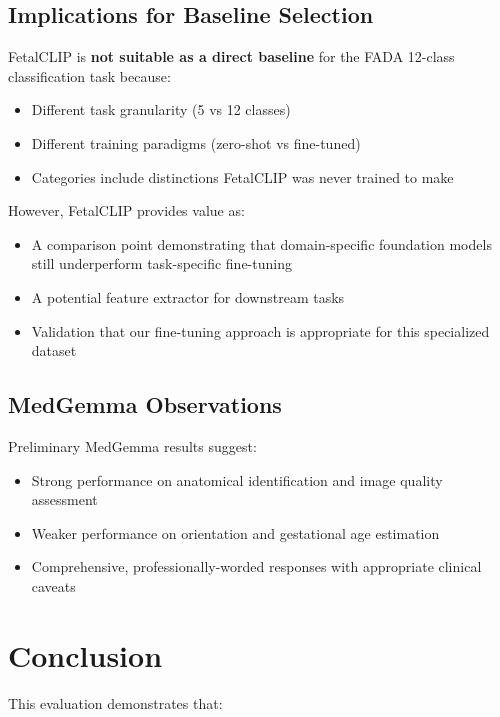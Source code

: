\documentclass[11pt,a4paper]{article}
\begin{document}
\subsection{Implications for Baseline Selection}

FetalCLIP is \textbf{not suitable as a direct baseline} for the FADA 12-class classification task because:

\begin{itemize}
    \item Different task granularity (5 vs 12 classes)
    \item Different training paradigms (zero-shot vs fine-tuned)
    \item Categories include distinctions FetalCLIP was never trained to make
\end{itemize}

However, FetalCLIP provides value as:
\begin{itemize}
    \item A comparison point demonstrating that domain-specific foundation models still underperform task-specific fine-tuning
    \item A potential feature extractor for downstream tasks
    \item Validation that our fine-tuning approach is appropriate for this specialized dataset
\end{itemize}

\subsection{MedGemma Observations}

Preliminary MedGemma results suggest:
\begin{itemize}
    \item Strong performance on anatomical identification and image quality assessment
    \item Weaker performance on orientation and gestational age estimation
    \item Comprehensive, professionally-worded responses with appropriate clinical caveats
\end{itemize}

\section{Conclusion}

This evaluation demonstrates that:
\end{document}
